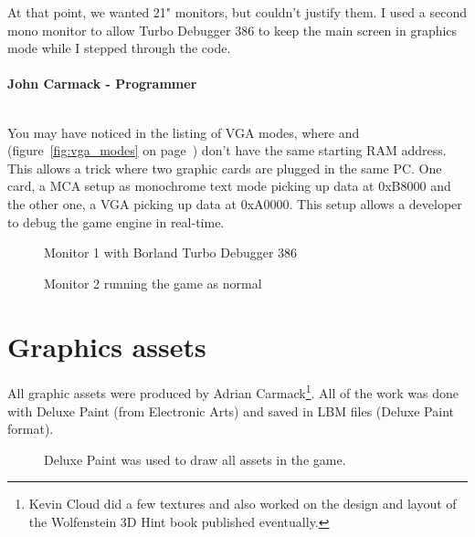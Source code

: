 \documentclass[book.tex]{subfiles}
\begin{document}
\begin{fancyquotes}
At that point, we wanted 21" monitors, but couldn't justify them.  I used a second mono monitor to allow Turbo Debugger 386 to keep the main screen in graphics mode while I stepped through the code.\\
 \\
\textbf{John Carmack - Programmer}
\end{fancyquotes}
\\
You may have noticed in the listing of VGA modes, where  and  (figure~\ref{fig:vga_modes} on page~\pageref{fig:vga_modes})  don't have the same starting RAM address. This allows a trick where two graphic cards are plugged in the same PC. One card, a MCA setup as monochrome text mode picking up data at 0xB8000 and the other one, a VGA picking up data at 0xA0000. This setup allows a developer to debug the game engine in real-time.\\
\begin{figure}[H]
\centering
\caption{Monitor 1 with Borland Turbo Debugger 386}
\label{fig:dm1}
\end{figure}

\begin{figure}[H]
\centering
\caption{Monitor 2 running the game as normal}
\label{fig:dm1}
\end{figure}



 
 
 




\section{Graphics assets}

All graphic assets were produced by Adrian Carmack\footnote{Kevin Cloud did a few textures and also worked on the design and layout of the Wolfenstein 3D Hint book published eventually.}. All of the work was done with Deluxe Paint (from Electronic Arts) and saved in LBM files (Deluxe Paint format). 

\begin{figure}[H]
  \centering
 \caption{Deluxe Paint was used to draw all assets in the game.}
\end{figure}
\end{document}
